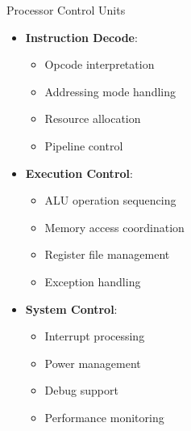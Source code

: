 \documentclass[aspectratio=169,11pt]{beamer}
\newcommand{\concept}[1]{\textbf{\color{accentcolor}#1}}
\begin{document}
\begin{frame}{Processor Control Units}
\begin{itemize}
\item \concept{Instruction Decode}:
\begin{itemize}
\item Opcode interpretation
\item Addressing mode handling
\item Resource allocation
\item Pipeline control
\end{itemize}
\vspace{0.5cm}
\item \concept{Execution Control}:
\begin{itemize}
\item ALU operation sequencing
\item Memory access coordination
\item Register file management
\item Exception handling
\end{itemize}
\vspace{0.3cm}
\item \concept{System Control}:
\begin{itemize}
\item Interrupt processing
\item Power management
\item Debug support
\item Performance monitoring
\end{itemize}
\end{itemize}
\end{frame}
\end{document}

